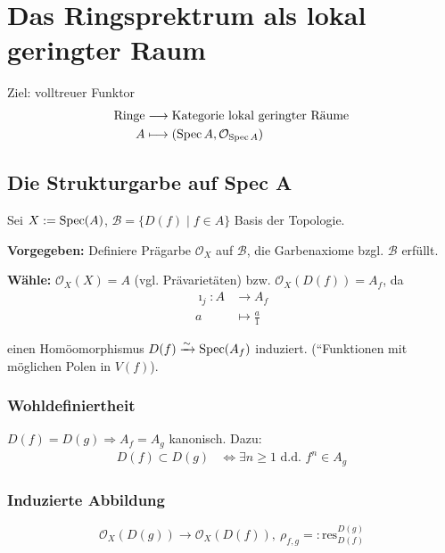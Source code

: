\chapter*{Das Ringsprektrum als lokal geringter Raum}
\label{chap:ringspektrum-lokal-geringter-raum}
Ziel: volltreuer Funktor
\begin{align*}
  \text{Ringe} & \longrightarrow\text{Kategorie lokal geringter Räume}\\
  A & \longmapsto(\operatorname{Spec} A,\mathcal{O}_{\operatorname{Spec} A})
\end{align*}

\section{Die Strukturgarbe auf Spec A}
\label{sec:strukturgarbe-auf-spec-A}

Sei $X:=\operatorname{Spec}(A)$, $\mathcal{B}=\{D(f)\mid f\in A\}$ Basis der Topologie.

\textbf{Vorgegeben:} Definiere Prägarbe $\mathcal{O}_{X}$ auf $\mathcal{B}$,
die Garbenaxiome bzgl. $\mathcal{B}$ erfüllt.

\textbf{Wähle:} $\mathcal{O}_{X}(X)=A$ (vgl. Prävarietäten) bzw.
$\mathcal{O}_{X}(D(f))=A_{f}$, da
\begin{align*}
  \imath_{j}:A & \longrightarrow A_{f}\\
  a & \longmapsto\frac{a}{1}
\end{align*}

einen Homöomorphismus $D(f)\xrightarrow{\sim}\operatorname{Spec}(A_{f})$ induziert.
(``Funktionen mit möglichen Polen in $V(f)$).

\subsection{Wohldefiniertheit}
\label{subsec:strukturgarbe-wohldefiniertheit}

$D(f)=D(g)\Rightarrow A_{f}=A_{g}$ kanonisch. Dazu: 
\begin{align*}
  D(f)\subset D(g) & \Leftrightarrow\exists n\geq1\text{ d.d. }f^{n}\in A_{g}
\end{align*}


\subsection{Induzierte Abbildung}
\label{subsec:strukturgarbe-induzierte-abbildung}

\[
\mathcal{O}_{X}(D(g))\rightarrow\mathcal{O}_{X}(D(f)),\ \rho_{f,g}=:\text{res}_{D(f)}^{D(g)}
\]

